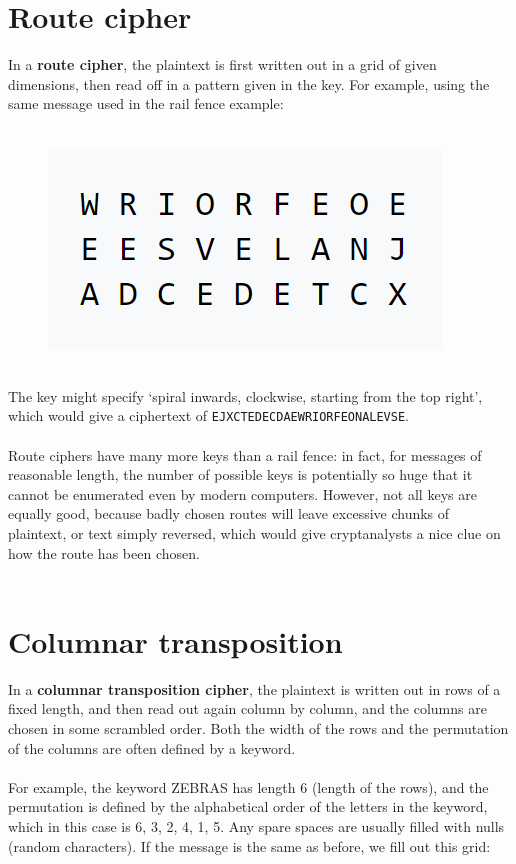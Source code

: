 \documentclass[Lau,binding=0.6cm,oneside]{sapthesis}
\begin{document}
\begin{appendices}
\section{Route cipher}
In a \textbf{route cipher}, the plaintext is first written out in a grid of given dimensions, then read off in a pattern given in the key. For example, using the same message used in the rail fence example:\\\\
\begin{figure}[H]
\includegraphics[scale=0.42]{route}
\centering
\caption{}
\centering
\end{figure}
\ \\
The key might specify `spiral inwards, clockwise, starting from the top right', which would give a ciphertext of \colorbox{gray!12}{\small{\texttt{EJXCTEDECDAEWRIORFEONALEVSE}}}.\\\\
Route ciphers have many more keys than a rail fence: in fact, for messages of reasonable length, the number of possible keys is potentially so huge that it cannot be enumerated even by modern computers. However, not all keys are equally good, because badly chosen routes will leave excessive chunks of plaintext, or text simply reversed, which would give cryptanalysts a nice clue on how the route has been chosen.\\\\

\section{Columnar transposition}
In a \textbf{columnar transposition cipher}, the plaintext is written out in rows of a fixed length, and then read out again column by column, and the columns are chosen in some scrambled order. Both the width of the rows and the permutation of the columns are often defined by a keyword.\\\\For example, the keyword \textsf{ZEBRAS} has length 6 (length of the rows), and the permutation is defined by the alphabetical order of the letters in the keyword, which in this case is 6, 3, 2, 4, 1, 5. Any spare spaces are usually filled with nulls (random characters). If the message is the same as before, we fill out this grid:\\\\


\end{appendices}
\end{document}

